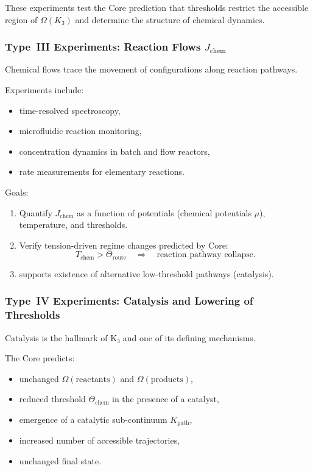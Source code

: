 These experiments test the Core prediction that thresholds restrict the
accessible region of $\Omega(K_3)$ and determine the structure of
chemical dynamics.



\subsubsection{Type~III Experiments: Reaction Flows $J_{\mathrm{chem}}$}

Chemical flows trace the movement of configurations along reaction pathways.

Experiments include:

\begin{itemize}
    \item time-resolved spectroscopy,
    \item microfluidic reaction monitoring,
    \item concentration dynamics in batch and flow reactors,
    \item rate measurements for elementary reactions.
\end{itemize}

Goals:

\begin{enumerate}
    \item Quantify $J_{\mathrm{chem}}$ as a function of potentials
          (chemical potentials $\mu$), temperature, and thresholds.
    \item Verify tension-driven regime changes predicted by Core:
          \[
             T_{\mathrm{chem}} > \Theta_{\mathrm{route}}
             \quad \Rightarrow \quad
             \text{reaction pathway collapse}.
          \]
    \item supports existence of alternative low-threshold pathways
          (catalysis).
\end{enumerate}



\subsubsection{Type~IV Experiments: Catalysis and Lowering of Thresholds}

Catalysis is the hallmark of K₃ and one of its defining mechanisms.

The Core predicts:

\begin{itemize}
    \item unchanged $\Omega(\text{reactants})$ and $\Omega(\text{products})$,
    \item reduced threshold $\Theta_{\mathrm{chem}}$ in the presence of a
          catalyst,
    \item emergence of a catalytic sub-continuum $K_{\mathrm{path}}$,
    \item increased number of accessible trajectories,
    \item unchanged final state.
\end{itemize}

